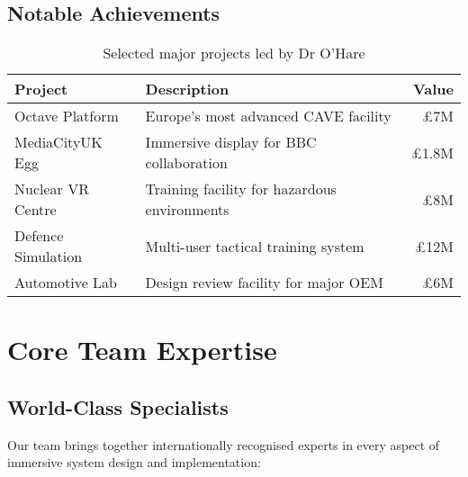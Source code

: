 \subsection{Notable Achievements}

\begin{table}[H]
\centering
\begin{tabularx}{\textwidth}{@{}lXr@{}}
\toprule
\textbf{Project} & \textbf{Description} & \textbf{Value} \\
\midrule
Octave Platform & Europe's most advanced CAVE facility & £7M \\
MediaCityUK Egg & Immersive display for BBC collaboration & £1.8M \\
Nuclear VR Centre & Training facility for hazardous environments & £8M \\
Defence Simulation & Multi-user tactical training system & £12M \\
Automotive Lab & Design review facility for major OEM & £6M \\
\bottomrule
\end{tabularx}
\caption{Selected major projects led by Dr O'Hare}
\end{table}

\section{Core Team Expertise}

\subsection{World-Class Specialists}

Our team brings together internationally recognised experts in every aspect of immersive system design and implementation:

